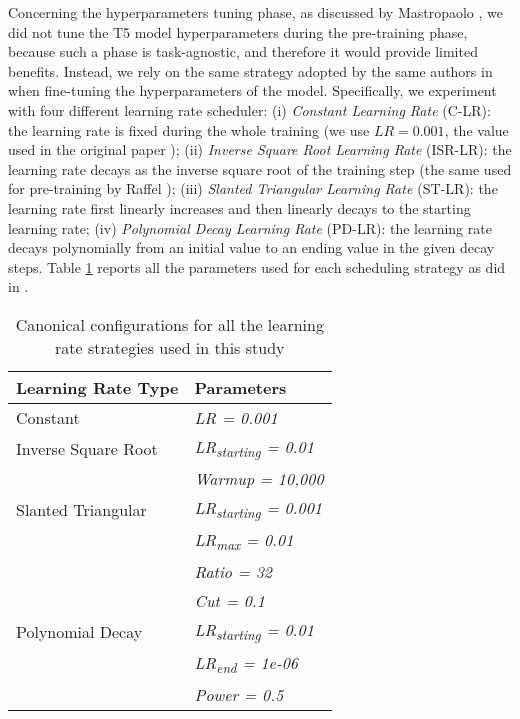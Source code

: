 Concerning the hyperparameters tuning phase, as discussed by Mastropaolo \etal \cite{mastropaolo2021studying}, we did not tune the T5 model hyperparameters during the pre-training phase, because such a phase is task-agnostic, and therefore it would provide limited benefits. Instead, we rely on the same strategy adopted by the same authors in \cite{mastropaolo2022using} when fine-tuning the hyperparameters of the model. Specifically, we experiment with four different learning rate scheduler: (i) \textit{Constant Learning Rate} (C-LR): the learning rate is fixed during the whole training (we use $LR = 0.001$, \ie the value used in the original paper \cite{raffel2019exploring}); (ii) \textit{Inverse Square Root Learning Rate} (ISR-LR): the learning rate decays as the inverse square root of the training step (the same used for pre-training by Raffel \etal); (iii) \textit{Slanted Triangular Learning Rate \cite{howard2018universal}} (ST-LR): the learning rate first linearly increases and then linearly decays to the starting learning rate;  (iv) \textit{Polynomial Decay Learning Rate} (PD-LR): the learning rate decays polynomially from an initial value to an ending value in the given decay steps. Table \ref{tab:learning-rates} reports all the parameters used for each scheduling strategy as did in \cite{mastropaolo2022using}.

\begin{table}[h]
	\centering
	\begin{tabular}{ll}
		\hline
		\textbf{Learning Rate Type} & \textbf{Parameters}               \\ \hline
		Constant                     & \textit{LR = 0.001}               \\
		Inverse Square Root         & \textit{LR\textsubscript{starting} = 0.01}  \\
		& \textit{Warmup = 10,000}          \\
		Slanted Triangular          & \textit{LR\textsubscript{starting} = 0.001} \\
		& \textit{LR\textsubscript{max} = 0.01}       \\
		& \textit{Ratio = 32}               \\
		& \textit{Cut = 0.1}                \\
		Polynomial Decay            & \textit{LR\textsubscript{starting} = 0.01}  \\
		& \textit{LR\textsubscript{end} = 1e-06}      \\
		& \textit{Power = 0.5}              \\ \hline
	\end{tabular}
	\vspace{0.2cm}
	\caption{Canonical configurations for all the learning rate strategies used in this study}
	\label{tab:learning-rates}
\end{table}

